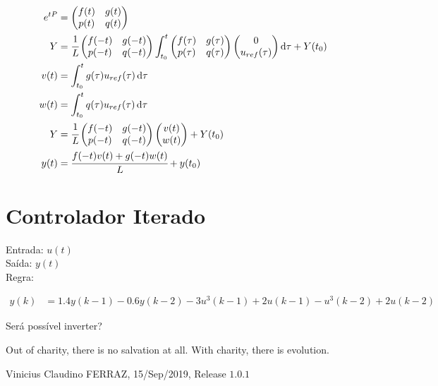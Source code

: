 \documentclass[12pt]{article}
\begin{document}
\begin{align}
e^{tP} &= \begin{pmatrix} f(t) & g(t) \\ p(t) & q(t) \end{pmatrix} \\
 Y &= \cfrac{1}{L} \begin{pmatrix} f(-t) & g(-t) \\ p(-t) & q(-t) \end{pmatrix} \int_{t_0}^t \begin{pmatrix} f(\tau) & g(\tau) \\ p(\tau) & q(\tau) \end{pmatrix} \begin{pmatrix} 0 \\ u_{ref}(\tau) \end{pmatrix} \mathrm{d}\tau + Y(t_0) \\
 v(t) &= \int_{t_0}^t g(\tau) u_{ref}(\tau) \,\mathrm{d}\tau \\
 w(t) &= \int_{t_0}^t q(\tau) u_{ref}(\tau) \,\mathrm{d}\tau \\
 Y &= \cfrac{1}{L} \begin{pmatrix} f(-t) & g(-t) \\ p(-t) & q(-t) \end{pmatrix}  \begin{pmatrix} v(t) \\ w(t) \end{pmatrix} + Y(t_0) \\
 y(t) &= \cfrac{f(-t)v(t) + g(-t)w(t)}{L}  + y(t_0)
\end{align}

\section{Controlador Iterado}

\begin{flushleft}
Entrada: $u(t)$ \\
Sa\'ida: $y(t)$ \\
Regra:
\end{flushleft}

\begin{align}
y(k) &= 1.4 y(k-1) - 0.6 y(k-2) - 3 u^3(k -1) + 2u(k-1) - u^3(k-2) + 2u(k-2)
\end{align}

Ser\'a poss\'ivel inverter?

\vspace{3mm}

Out of charity, there is no salvation at all. With charity, there is evolution.

\vspace{3mm}

Vinicius Claudino FERRAZ, 15/Sep/2019, Release $1.0.1$
\end{document}
